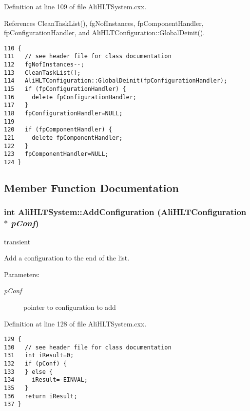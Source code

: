 Definition at line 109 of file Ali\-HLTSystem.cxx.

References Clean\-Task\-List(), fg\-Nof\-Instances, fp\-Component\-Handler, fp\-Configuration\-Handler, and Ali\-HLTConfiguration::Global\-Deinit().

\footnotesize\begin{verbatim}110 {
111   // see header file for class documentation
112   fgNofInstances--;
113   CleanTaskList();
114   AliHLTConfiguration::GlobalDeinit(fpConfigurationHandler);
115   if (fpConfigurationHandler) {
116     delete fpConfigurationHandler;
117   }
118   fpConfigurationHandler=NULL;
119   
120   if (fpComponentHandler) {
121     delete fpComponentHandler;
122   }
123   fpComponentHandler=NULL;
124 }
\end{verbatim}\normalsize 




\subsection{Member Function Documentation}
\subsubsection{\setlength{\rightskip}{0pt plus 5cm}int Ali\-HLTSystem::Add\-Configuration ({\bf Ali\-HLTConfiguration} $\ast$ {\em p\-Conf})}\label{classAliHLTSystem_a4}


transient 

Add a configuration to the end of the list. \begin{Desc}
\item[Parameters:]
\begin{description}
\item[{\em p\-Conf}]pointer to configuration to add \end{description}
\end{Desc}


Definition at line 128 of file Ali\-HLTSystem.cxx.

\footnotesize\begin{verbatim}129 {
130   // see header file for class documentation
131   int iResult=0;
132   if (pConf) {
133   } else {
134     iResult=-EINVAL;
135   }
136   return iResult;
137 }
\end{verbatim}\normalsize 


